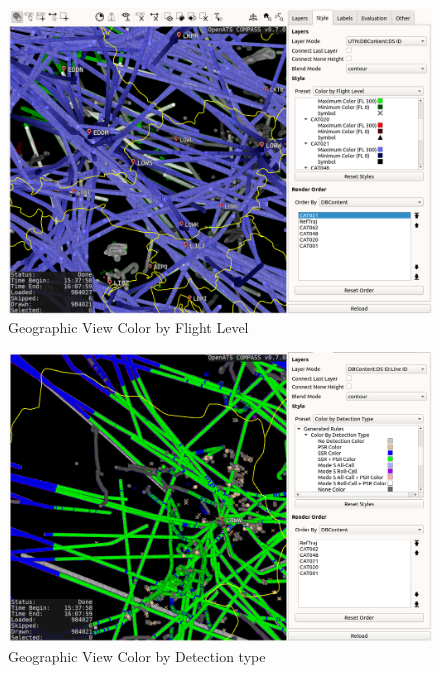 \begin{figure}[H]
    \hspace*{-2.5cm}
    \includegraphics[width=19cm,frame]{figures/geoview_style_flight_level.png}
  \caption{Geographic View Color by Flight Level}
\end{figure}

\begin{figure}[H]
    \hspace*{-2.5cm}
    \includegraphics[width=19cm,frame]{figures/geoview_style_detection_type.png}
  \caption{Geographic View Color by Detection type}
\end{figure}

